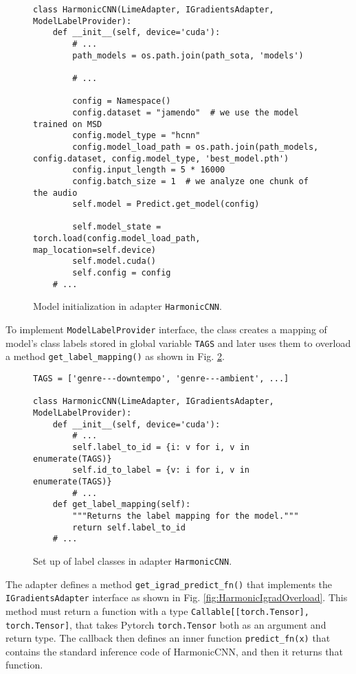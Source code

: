 \documentclass[
    bindingoffset=5mm,  %
    footnoteindent=3mm, %
    hyphenation=true    %
]{src/wut-thesis}
\begin{document}
\begin{figure}%
\begin{verbatim}
class HarmonicCNN(LimeAdapter, IGradientsAdapter, ModelLabelProvider):
    def __init__(self, device='cuda'):
        # ...
        path_models = os.path.join(path_sota, 'models')

        # ...

        config = Namespace()
        config.dataset = "jamendo"  # we use the model trained on MSD
        config.model_type = "hcnn"
        config.model_load_path = os.path.join(path_models, config.dataset, config.model_type, 'best_model.pth')
        config.input_length = 5 * 16000
        config.batch_size = 1  # we analyze one chunk of the audio
        self.model = Predict.get_model(config)
        
        self.model_state = torch.load(config.model_load_path, map_location=self.device)
        self.model.cuda()
        self.config = config
    # ...
\end{verbatim}
\caption{Model initialization in adapter \texttt{HarmonicCNN}.}
\label{fig:HarmonicCNNInit}
\end{figure}

To implement \texttt{ModelLabelProvider} interface, the class creates a mapping of model's class
labels stored in global variable \texttt{TAGS} and later uses them to overload
a method \texttt{get_label_mapping()} as shown in Fig. \ref{fig:HarmonicLabelMapping}.

\begin{figure}[h!]
\begin{verbatim}
TAGS = ['genre---downtempo', 'genre---ambient', ...]

class HarmonicCNN(LimeAdapter, IGradientsAdapter, ModelLabelProvider):
    def __init__(self, device='cuda'):
        # ...
        self.label_to_id = {i: v for i, v in enumerate(TAGS)}
        self.id_to_label = {v: i for i, v in enumerate(TAGS)}
        # ...
    def get_label_mapping(self):
        """Returns the label mapping for the model."""
        return self.label_to_id
    # ...
\end{verbatim}
\caption{Set up of label classes in adapter \texttt{HarmonicCNN}.}
\label{fig:HarmonicLabelMapping}
\end{figure}

The adapter defines a method \texttt{get_igrad_predict_fn()} that implements
the \texttt{IGradientsAdapter} interface as shown in Fig. \ref{fig:HarmonicIgradOverload}.
This method must return a function with a type \texttt{Callable[[torch.Tensor], torch.Tensor]}, %
that takes Pytorch \texttt{torch.Tensor} both as an argument and return type.
The callback then defines an inner function \texttt{predict_fn(x)} that contains
the standard inference code of HarmonicCNN, and then it returns that function.
\end{document}
